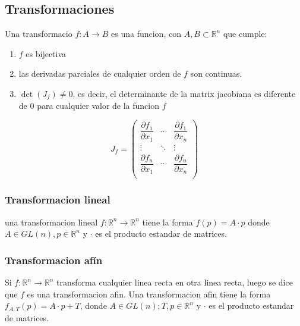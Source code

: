 \subsection{Transformaciones}
Una transformacio $f : A \to B$ es una funcion, con $A, B \subset \mathbb{R}^n$ que cumple:
\begin{enumerate}
  \item $f$ es bijectiva
  \item las derivadas parciales de cualquier orden de $f$ son continuas.
  \item $\det(J_f) \neq 0$, es decir, el determinante de la matrix jacobiana
    es diferente de $0$ para cualquier valor de la funcion $f$
\end{enumerate}
\[J_f =
\begin{pmatrix}
  \dfrac{\partial f_1}{\partial x_1} & \cdots & \dfrac{\partial f_1}{\partial x_n} \\
           \vdots           & \ddots &         \vdots           \\
  \dfrac{\partial f_n}{\partial x_1} & \cdots & \dfrac{\partial f_n}{\partial x_n}  \\
\end{pmatrix}\]
\subsubsection{Transformacion lineal}
una transformacion lineal $f : \mathbb{R}^n \to \mathbb{R}^n$ tiene la forma
$f(p) = A \cdot p$ donde $A \in GL(n), p \in \mathbb{R}^n$ y $\cdot$ es el producto
estandar de matrices.

\subsubsection{Transformacion afín}
Si $f : \mathbb{R}^n \to \mathbb{R}^n$ transforma cualquier linea recta en otra
linea recta, luego se dice que $f$ es una transformacion afin. Una
transformacion afin tiene la forma $f_{A, T}(p) = A \cdot p + T$, donde
$A \in GL(n); T, p \in \mathbb{R}^n$ y $\cdot$ es el producto estandar de matrices.

